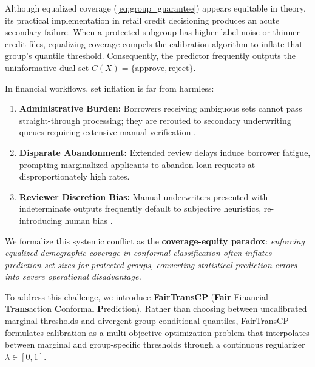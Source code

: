 \documentclass[conference]{IEEEtran}
\begin{document}
Although equalized coverage (\ref{eq:group_guarantee}) appears equitable in theory, its practical implementation in retail credit decisioning produces an acute secondary failure. When a protected subgroup has higher label noise or thinner credit files, equalizing coverage compels the calibration algorithm to inflate that group's quantile threshold. Consequently, the predictor frequently outputs the uninformative dual set $C(X) = \{\text{approve}, \text{reject}\}$.

In financial workflows, set inflation is far from harmless:
\begin{enumerate}
    \item \textbf{Administrative Burden:} Borrowers receiving ambiguous sets cannot pass straight-through processing; they are rerouted to secondary underwriting queues requiring extensive manual verification \cite{cresswell2025conformal}.
    \item \textbf{Disparate Abandonment:} Extended review delays induce borrower fatigue, prompting marginalized applicants to abandon loan requests at disproportionately high rates.
    \item \textbf{Reviewer Discretion Bias:} Manual underwriters presented with indeterminate outputs frequently default to subjective heuristics, re-introducing human bias \cite{charpentier2024insurance}.
\end{enumerate}

We formalize this systemic conflict as the \textbf{coverage-equity paradox}: \emph{enforcing equalized demographic coverage in conformal classification often inflates prediction set sizes for protected groups, converting statistical prediction errors into severe operational disadvantage.}

To address this challenge, we introduce \textbf{FairTransCP} (\textbf{Fair} Financial \textbf{Trans}action \textbf{C}onformal \textbf{P}rediction). Rather than choosing between uncalibrated marginal thresholds and divergent group-conditional quantiles, FairTransCP formulates calibration as a multi-objective optimization problem that interpolates between marginal and group-specific thresholds through a continuous regularizer $\lambda \in [0, 1]$.
\end{document}
